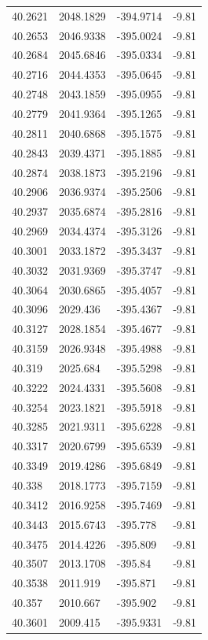 \begin{table}[H]
\begin{tabular}{llll}
40.2621 & 2048.1829 & -394.9714 & -9.81 \\
40.2653 & 2046.9338 & -395.0024 & -9.81 \\
40.2684 & 2045.6846 & -395.0334 & -9.81 \\
40.2716 & 2044.4353 & -395.0645 & -9.81 \\
40.2748 & 2043.1859 & -395.0955 & -9.81 \\
40.2779 & 2041.9364 & -395.1265 & -9.81 \\
40.2811 & 2040.6868 & -395.1575 & -9.81 \\
40.2843 & 2039.4371 & -395.1885 & -9.81 \\
40.2874 & 2038.1873 & -395.2196 & -9.81 \\
40.2906 & 2036.9374 & -395.2506 & -9.81 \\
40.2937 & 2035.6874 & -395.2816 & -9.81 \\
40.2969 & 2034.4374 & -395.3126 & -9.81 \\
40.3001 & 2033.1872 & -395.3437 & -9.81 \\
40.3032 & 2031.9369 & -395.3747 & -9.81 \\
40.3064 & 2030.6865 & -395.4057 & -9.81 \\
40.3096 & 2029.436 & -395.4367 & -9.81 \\
40.3127 & 2028.1854 & -395.4677 & -9.81 \\
40.3159 & 2026.9348 & -395.4988 & -9.81 \\
40.319 & 2025.684 & -395.5298 & -9.81 \\
40.3222 & 2024.4331 & -395.5608 & -9.81 \\
40.3254 & 2023.1821 & -395.5918 & -9.81 \\
40.3285 & 2021.9311 & -395.6228 & -9.81 \\
40.3317 & 2020.6799 & -395.6539 & -9.81 \\
40.3349 & 2019.4286 & -395.6849 & -9.81 \\
40.338 & 2018.1773 & -395.7159 & -9.81 \\
40.3412 & 2016.9258 & -395.7469 & -9.81 \\
40.3443 & 2015.6743 & -395.778 & -9.81 \\
40.3475 & 2014.4226 & -395.809 & -9.81 \\
40.3507 & 2013.1708 & -395.84 & -9.81 \\
40.3538 & 2011.919 & -395.871 & -9.81 \\
40.357 & 2010.667 & -395.902 & -9.81 \\
40.3601 & 2009.415 & -395.9331 & -9.81 \\

\end{tabular}
\end{table}

